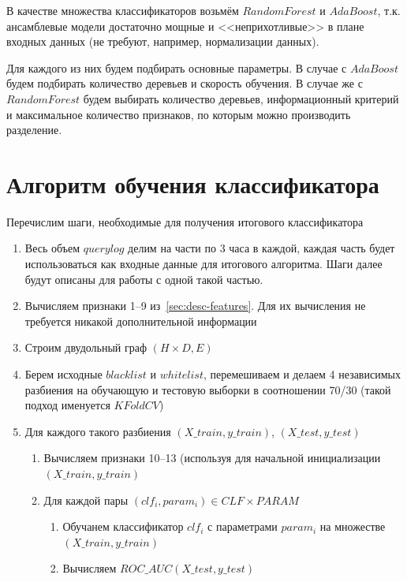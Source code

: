 \documentclass[14pt]{extreport} %
\begin{document}
В качестве множества классификаторов возьмём $RandomForest$ и $AdaBoost$, т.к. ансамблевые модели достаточно мощные и <<неприхотливые>> в плане входных данных (не требуют, например, нормализации данных).
	
Для каждого из них будем подбирать основные параметры. В случае с $AdaBoost$ будем подбирать количество деревьев и скорость обучения. В случае же с $RandomForest$ будем выбирать количество деревьев, информационный критерий и максимальное количество признаков, по которым можно производить разделение.
	 
	 
\section{Алгоритм обучения классификатора}
Перечислим шаги, необходимые для получения итогового классификатора
\begin{enumerate}
	\item Весь объем $querylog$ делим на части по 3 часа в каждой, каждая часть будет использоваться как входные данные для итогового алгоритма. Шаги далее будут описаны для работы с одной такой частью.
	      	      	
	\item Вычисляем признаки 1--9 из~\ref{sec:desc-features}. Для их вычисления не требуется никакой дополнительной информации
	      	      	
	\item Строим двудольный граф $(H \times D, E)$
	      	      	
	\item Берем исходные $blacklist$ и $whitelist$, перемешиваем и делаем 4 независимых разбиения на обучающую и тестовую выборки в соотношении 70/30 
	      (такой подход именуется $KFold CV$)
	      	      	
	\item Для каждого такого разбиения $(X\_train, y\_train)$, $(X\_test, y\_test)$
	      \begin{enumerate}
	      	\item Вычисляем признаки 10--13 (используя для начальной инициализации $(X\_train, y\_train)$
	      	\item Для каждой пары $(clf_i, param_i) \in CLF\times PARAM$
	      	      \begin{enumerate}
	      	      	\item Обучанем классификатор $clf_i$ с параметрами $param_i$ на множестве $(X\_train, y\_train)$
	      	      	\item Вычисляем $ROC\_AUC(X\_test, y\_test)$
	      	      \end{enumerate}
	      	      	      	      	

\end{enumerate}
\end{enumerate}
\end{document}
